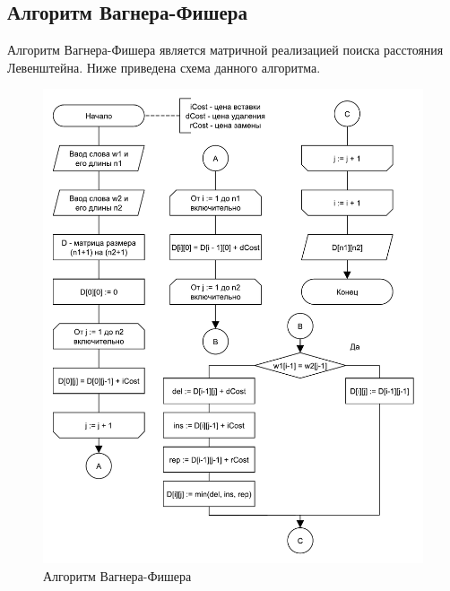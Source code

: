 \subsection{Алгоритм Вагнера-Фишера}
Алгоритм Вагнера-Фишера является матричной реализацией поиска расстояния Левенштейна. Ниже приведена схема данного алгоритма.
\begin{figure}[H]
    \centering
    \includegraphics[scale=0.8]{pdf/wagner-fischer-all.pdf}
    \caption{Алгоритм Вагнера-Фишера}
\end{figure}

